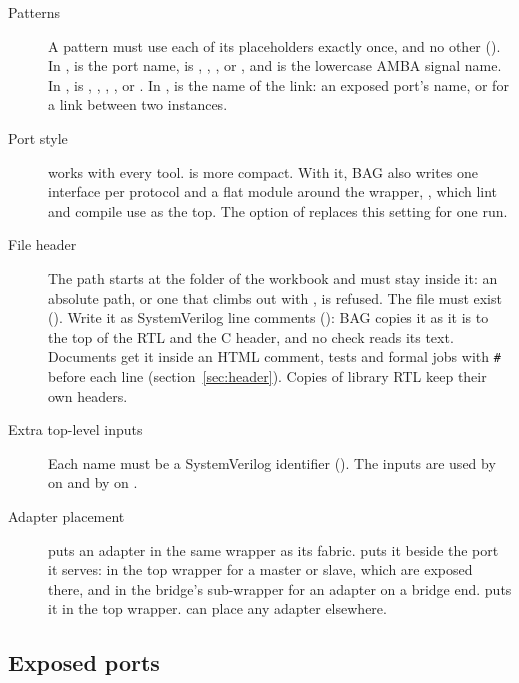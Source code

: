 \begin{description}
\item[Patterns] A pattern must use each of its placeholders exactly once, and no other
  (). In ,  is the port
  name,  is , , ,  or
  , and  is the lowercase AMBA signal name. In
  ,  is , , ,
  ,  or . In ,
   is the name of the link: an exposed port's name, or
   for a link between two instances.
\item[Port style]  works with every tool.  is more
  compact. With it, BAG also writes one interface per protocol and a flat module around
  the wrapper, , which lint and compile use as the top. The option
   of  replaces this setting for one run.
\item[File header] The path starts at the folder of the workbook and must stay inside
  it: an absolute path, or one that climbs out with , is refused. The file must
  exist (). Write it as SystemVerilog line comments (\code{//}): BAG copies it as it is to the top of
  the RTL and the C header, and no check reads its text. Documents get it inside an HTML
  comment, tests and formal jobs with \texttt{\#} before each line
  (section~\ref{sec:header}). Copies of library RTL keep their own headers.
\item[Extra top-level inputs] Each name must be a SystemVerilog identifier
  (). The inputs are used by  on
   and by  on .
\item[Adapter placement]  puts an adapter in the same wrapper as its
  fabric.  puts it beside the port it serves: in the top wrapper for a
  master or slave, which are exposed there, and in the bridge's sub-wrapper for an adapter
  on a bridge end.  puts it in the top wrapper.  can place any adapter elsewhere.
\end{description}

\subsection{Exposed ports}

